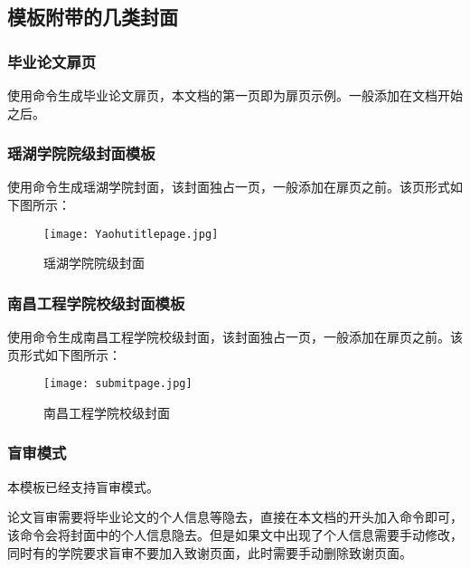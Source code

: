 \documentclass{nitthesis}
\begin{document}
\subsection{模板附带的几类封面}

\subsubsection{毕业论文扉页}

使用命令生成毕业论文扉页，本文档的第一页即为扉页示例。一般添加在文档开始之后。

\subsubsection{瑶湖学院院级封面模板}

使用命令生成瑶湖学院封面，该封面独占一页，一般添加在扉页之前。该页形式如下图所示：

\begin{figure}[H]
    \begin{center}
        \texttt{[image: Yaohutitlepage.jpg]}
        \caption{瑶湖学院院级封面}
    \end{center}
\end{figure}

\subsubsection{南昌工程学院校级封面模板}

使用命令生成南昌工程学院校级封面，该封面独占一页，一般添加在扉页之前。该页形式如下图所示：

\begin{figure}[H]
    \begin{center}
        \texttt{[image: submitpage.jpg]}
        \caption{南昌工程学院校级封面}
    \end{center}
\end{figure}

\subsubsection{盲审模式}

本模板已经支持盲审模式。

论文盲审需要将毕业论文的个人信息等隐去，直接在本文档的开头加入命令即可，该命令会将封面中的个人信息隐去。但是如果文中出现了个人信息需要手动修改，同时有的学院要求盲审不要加入致谢页面，此时需要手动删除致谢页面。
\end{document}
